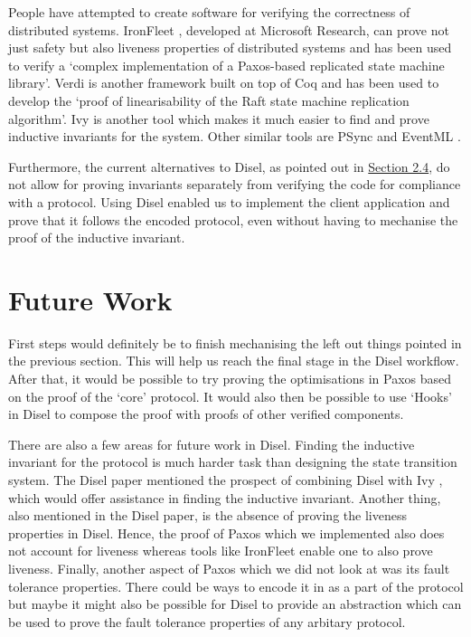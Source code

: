 People have attempted to create software for verifying the correctness of distributed
systems. IronFleet \cite{15}, developed at Microsoft Research, can prove not just
safety but also liveness properties of distributed systems and has been used
to verify a `complex implementation of a Paxos-based replicated state machine
library'. Verdi \cite{16} is another framework built on top of Coq and has been used
to develop the `proof of linearisability of the Raft state machine replication
algorithm'. Ivy \cite{19} is another tool which makes it much easier to find and
prove inductive invariants for the system. Other similar tools are PSync \cite{17}
and EventML \cite{18}.

Furthermore, the current alternatives to Disel, as pointed out in
\hyperref[sec:relatedWork]{Section 2.4}, do not allow for proving invariants
separately from verifying the code for compliance with a protocol. Using
Disel enabled us to implement the client application and prove that it
follows the encoded protocol, even without having to mechanise the proof of the
inductive invariant.


\section{Future Work}
First steps would definitely be to finish mechanising the left out things
pointed in the previous section. This will help us reach the final stage in the Disel
workflow. After that, it would be possible to try proving the optimisations
in Paxos based on the proof of the `core' protocol. It would also then be possible
to use `Hooks' \cite{9} in Disel to compose the proof with proofs of other
verified components.

There are also a few areas for future work in Disel.
Finding the inductive invariant for the protocol is much harder task than
designing the state transition system. The Disel paper \cite{9} mentioned the prospect
of combining Disel with Ivy \cite{19}, which would offer assistance in finding
the inductive invariant. Another thing, also mentioned in the Disel paper, is
the absence of proving the liveness properties in Disel. Hence, the proof of
Paxos which we implemented also does not account for liveness whereas tools like
IronFleet \cite{15} enable one to also prove liveness.
Finally, another aspect of Paxos which we did not look at was its fault
tolerance properties. There could be ways to encode it in as a part of the
protocol but maybe it might also be possible for Disel to provide an
abstraction which can be used to prove the fault tolerance properties of
any arbitary protocol.
